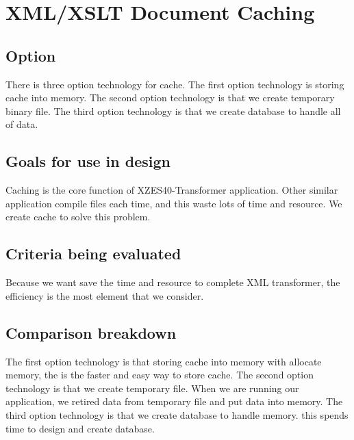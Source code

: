 \section{XML/XSLT Document Caching}

\subsection{Option}
There is three option technology for cache. The first option technology is storing cache into memory. The second option technology is that we create temporary binary file. The third option technology is that we create database to handle all of data.

\subsection{Goals for use in design}
Caching is the core function of XZES40-Transformer application. Other similar application compile files each time, and this waste lots of time and resource. We create cache to solve this problem.

\subsection{Criteria being evaluated}
Because we want save the time and resource to complete XML transformer, the efficiency is the most element that we consider.

\subsection{Comparison breakdown}
The first option technology is that storing cache into memory with allocate memory, the is the faster and easy way to store cache. The second option technology is that we create temporary file. When we are running our application, we retired data from temporary file and put data into memory. The third option technology is that we create database to handle memory. this spends time to design and create database.

